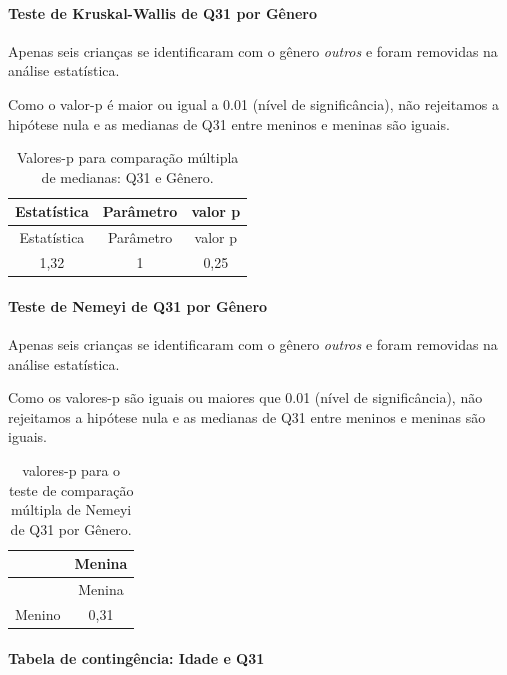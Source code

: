 \documentclass[]{article}
\let\oldparagraph\paragraph
\renewcommand{\paragraph}[1]{\oldparagraph{#1}\mbox{}}
\begin{document}
\hypertarget{teste-de-kruskal-wallis-de-q31-por-guxeanero}{%
\paragraph{Teste de Kruskal-Wallis de Q31 por Gênero}\label{teste-de-kruskal-wallis-de-q31-por-guxeanero}}

Apenas seis crianças se identificaram com o gênero \emph{outros} e foram removidas na análise estatística.

Como o valor-p é maior ou igual a 0.01 (nível de significância), não rejeitamos a hipótese nula e as medianas de Q31 entre meninos e meninas são iguais.

\begin{longtable}[]{@{}ccc@{}}
\caption{\label{tab:unnamed-chunk-1032}Valores-p para comparação múltipla de medianas: Q31 e Gênero.}\tabularnewline
\toprule
Estatística & Parâmetro & valor p\tabularnewline
\midrule
\endfirsthead
\toprule
Estatística & Parâmetro & valor p\tabularnewline
\midrule
\endhead
1,32 & 1 & 0,25\tabularnewline
\bottomrule
\end{longtable}

\hypertarget{teste-de-nemeyi-de-q31-por-guxeanero}{%
\paragraph{Teste de Nemeyi de Q31 por Gênero}\label{teste-de-nemeyi-de-q31-por-guxeanero}}

Apenas seis crianças se identificaram com o gênero \emph{outros} e foram removidas na análise estatística.

Como os valores-p são iguais ou maiores que 0.01 (nível de significância), não rejeitamos a hipótese nula e as medianas de Q31 entre meninos e meninas são iguais.

\begin{longtable}[]{@{}lc@{}}
\caption{\label{tab:unnamed-chunk-1034}valores-p para o teste de comparação múltipla de Nemeyi de Q31 por Gênero.}\tabularnewline
\toprule
& Menina\tabularnewline
\midrule
\endfirsthead
\toprule
& Menina\tabularnewline
\midrule
\endhead
Menino & 0,31\tabularnewline
\bottomrule
\end{longtable}

\cleardoublepage

\hypertarget{tabela-de-continguxeancia-idade-e-q31}{%
\paragraph{Tabela de contingência: Idade e Q31}\label{tabela-de-continguxeancia-idade-e-q31}}
\end{document}
